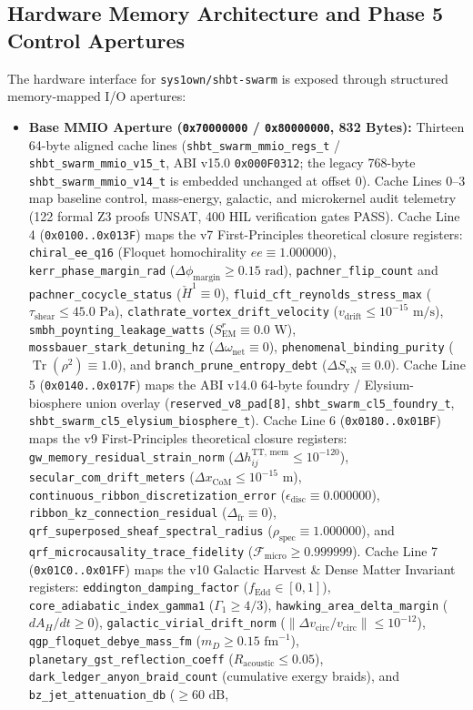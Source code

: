 \documentclass[11pt,onecolumn]{article}
\begin{document}
\subsection{Hardware Memory Architecture and Phase 5 Control Apertures}
The hardware interface for \texttt{sys1own/shbt-swarm} is exposed through structured memory-mapped I/O apertures:
\begin{itemize}
    \item \textbf{Base MMIO Aperture (\texttt{0x70000000} / \texttt{0x80000000}, 832 Bytes):} Thirteen 64-byte aligned cache lines (\texttt{shbt\_swarm\_mmio\_regs\_t} / \texttt{shbt\_swarm\_mmio\_v15\_t}, ABI v15.0 \texttt{0x000F0312}; the legacy 768-byte \texttt{shbt\_swarm\_mmio\_v14\_t} is embedded unchanged at offset 0). Cache Lines 0--3 map baseline control, mass-energy, galactic, and microkernel audit telemetry (122 formal Z3 proofs UNSAT, 400 HIL verification gates PASS). Cache Line 4 (\texttt{0x0100..0x013F}) maps the v7 First-Principles theoretical closure registers: \texttt{chiral\_ee\_q16} (Floquet homochirality $ee \equiv 1.000000$), \texttt{kerr\_phase\_margin\_rad} ($\Delta\phi_{\mathrm{margin}} \ge 0.15\text{ rad}$), \texttt{pachner\_flip\_count} and \texttt{pachner\_cocycle\_status} ($\check{H}^1 \equiv 0$), \texttt{fluid\_cft\_reynolds\_stress\_max} ($\tau_{\mathrm{shear}} \le 45.0\text{ Pa}$), \texttt{clathrate\_vortex\_drift\_velocity} ($v_{\mathrm{drift}} \le 10^{-15}\text{ m/s}$), \texttt{smbh\_poynting\_leakage\_watts} ($S_{\mathrm{EM}}^r \equiv 0.0\text{ W}$), \texttt{mossbauer\_stark\_detuning\_hz} ($\Delta\omega_{\mathrm{net}} \equiv 0$), \texttt{phenomenal\_binding\_purity} ($\operatorname{Tr}(\rho^2) \equiv 1.0$), and \texttt{branch\_prune\_entropy\_debt} ($\Delta S_{\mathrm{vN}} \equiv 0.0$). Cache Line 5 (\texttt{0x0140..0x017F}) maps the ABI v14.0 64-byte foundry / Elysium-biosphere union overlay (\texttt{reserved\_v8\_pad[8]}, \texttt{shbt\_swarm\_cl5\_foundry\_t}, \texttt{shbt\_swarm\_cl5\_elysium\_biosphere\_t}). Cache Line 6 (\texttt{0x0180..0x01BF}) maps the v9 First-Principles theoretical closure registers: \texttt{gw\_memory\_residual\_strain\_norm} ($\Delta h_{ij}^{\text{TT, mem}} \le 10^{-120}$), \texttt{secular\_com\_drift\_meters} ($\Delta x_{\text{CoM}} \le 10^{-15}\text{ m}$), \texttt{continuous\_ribbon\_discretization\_error} ($\epsilon_{\text{disc}} \equiv 0.000000$), \texttt{ribbon\_kz\_connection\_residual} ($\Delta_{\text{fr}} \equiv 0$), \texttt{qrf\_superposed\_sheaf\_spectral\_radius} ($\rho_{\text{spec}} \equiv 1.000000$), and \texttt{qrf\_microcausality\_trace\_fidelity} ($\mathcal{F}_{\text{micro}} \ge 0.999999$). Cache Line 7 (\texttt{0x01C0..0x01FF}) maps the v10 Galactic Harvest \& Dense Matter Invariant registers: \texttt{eddington\_damping\_factor} ($f_{\text{Edd}} \in [0, 1]$), \texttt{core\_adiabatic\_index\_gamma1} ($\Gamma_1 \ge 4/3$), \texttt{hawking\_area\_delta\_margin} ($dA_H / dt \ge 0$), \texttt{galactic\_virial\_drift\_norm} ($\|\Delta v_{\text{circ}} / v_{\text{circ}}\| \le 10^{-12}$), \texttt{qgp\_floquet\_debye\_mass\_fm} ($m_D \ge 0.15\text{ fm}^{-1}$), \texttt{planetary\_gst\_reflection\_coeff} ($R_{\text{acoustic}} \le 0.05$), \texttt{dark\_ledger\_anyon\_braid\_count} (cumulative exergy braids), and \texttt{bz\_jet\_attenuation\_db} ($\ge 60\text{ dB}$, 
\end{itemize}
\end{document}
